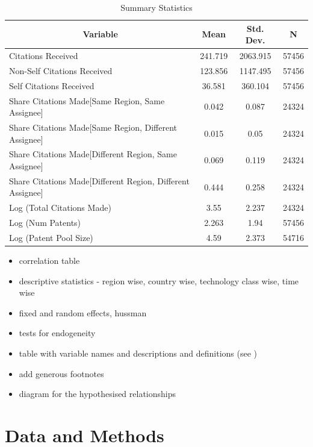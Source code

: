 \documentclass[12pt,letterpaper]{article}
\begin{document}
\begin{table}[htbp]\centering \caption{Summary Statistics \label{sumstat}}
\begin{tabular}{l c c  c}\hline\hline
\multicolumn{1}{c}{\textbf{Variable}} & \textbf{Mean}
 & \textbf{Std. Dev.} & \textbf{N}\\ \hline
Citations Received & 241.719 & 2063.915  & 57456\\
Non-Self Citations Received & 123.856 & 1147.495  & 57456\\
Self Citations Received & 36.581 & 360.104  & 57456\\
Share Citations Made[Same Region, Same Assignee] & 0.042 & 0.087  & 24324\\
Share Citations Made[Same Region, Different Assignee] & 0.015 & 0.05  & 24324\\
Share Citations Made[Different Region, Same Assignee] & 0.069 & 0.119  & 24324\\
Share Citations Made[Different Region, Different Assignee] & 0.444 & 0.258  & 24324\\
Log (Total Citations Made) & 3.55 & 2.237  & 24324\\
Log (Num Patents) & 2.263 & 1.94  & 57456\\
Log (Patent Pool Size) & 4.59 & 2.373  & 54716\\
\hline
\end{tabular}
\end{table}


\normalsize
\doublespacing

\begin{itemize}
\item correlation table
\item descriptive statistics - region wise, country wise, technology class wise, time wise
\item fixed and random effects, hussman
\item tests for endogeneity
\item table with variable names and descriptions and definitions (see \cite{Funk2014})
\item add generous footnotes
\item diagram for the hypothesised relationships
\end{itemize}
\section*{Data and Methods}
\end{document}
